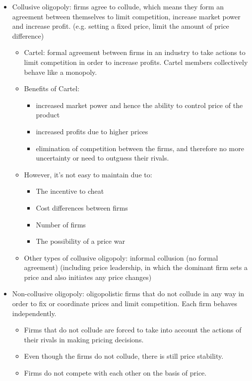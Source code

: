 \documentclass[a4paper,12pt]{article}
\begin{document}
\begin{itemize}
  \item Collusive oligopoly: firms agree to collude, which means they form an agreement between themselves to limit competition, increase market power and increase profit. (e.g. setting a fixed price, limit the amount of price difference)
  \begin{itemize}
    \item Cartel: formal agreement between firms in an industry to take actions to limit competition in order to increase profits. Cartel members collectively behave like a monopoly.
    \item Benefits of Cartel:
    \begin{itemize}
      \item increased market power and hence the ability to control price of the product
      \item increased profits due to higher prices
      \item elimination of competition between the firms, and therefore no more uncertainty or need to outguess their rivals.
    \end{itemize}
    \item However, it's not easy to maintain due to:
    \begin{itemize}
      \item The incentive to cheat
      \item Cost differences between firms
      \item Number of firms
      \item The possibility of a price war
    \end{itemize}
    \item Other types of collusive oligopoly: informal collusion (no formal agreement) (including price leadership, in which the dominant firm sets a price and also initiates any price changes)
  \end{itemize}
  \item Non-collusive oligopoly: oligopolistic firms that do not collude in any way in order to fix or coordinate prices and limit competition. Each firm behaves independently.
  \begin{itemize}
    \item Firms that do not collude are forced to take into account the actions of their rivals in making pricing decisions.
    \item Even though the firms do not collude, there is still price stability.
    \item Firms do not compete with each other on the basis of price.
  \end{itemize}
\end{itemize}
\end{document}
